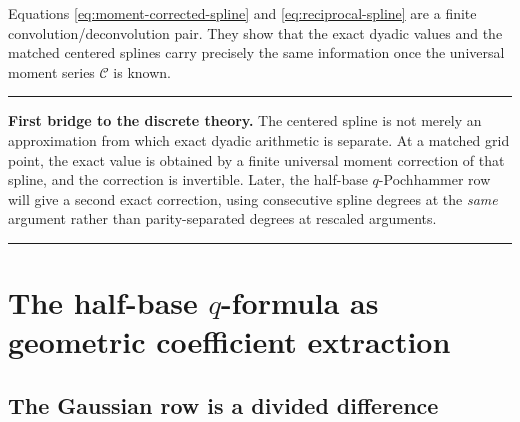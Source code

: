 \documentclass[11pt,oneside]{article}
\theoremstyle{definition}
\theoremstyle{remark}
\newenvironment{boxedremark}{%
  \par\smallskip\noindent\begin{center}\begin{minipage}{0.94\textwidth}%
  \color{black}\hrule\vspace{0.6em}\small
}{%
  \vspace{0.6em}\hrule\end{minipage}\end{center}\smallskip
}
\begin{document}
Equations \eqref{eq:moment-corrected-spline} and \eqref{eq:reciprocal-spline} are a finite
convolution/deconvolution pair.  They show that the exact dyadic values and the matched centered
splines carry precisely the same information once the universal moment series $\mathscr C$ is
known.

\begin{boxedremark}
\textbf{First bridge to the discrete theory.}
The centered spline is not merely an approximation from which exact dyadic arithmetic is
separate.  At a matched grid point, the exact value is obtained by a finite universal moment
correction of that spline, and the correction is invertible.  Later, the half-base
$q$-Pochhammer row will give a second exact correction, using consecutive spline degrees at
the \emph{same} argument rather than parity-separated degrees at rescaled arguments.
\end{boxedremark}

\section[The half-base q-formula as geometric coefficient extraction]{The half-base $q$-formula as geometric coefficient extraction}
\label{sec:q-extraction}

\subsection{The Gaussian row is a divided difference}
\end{document}
